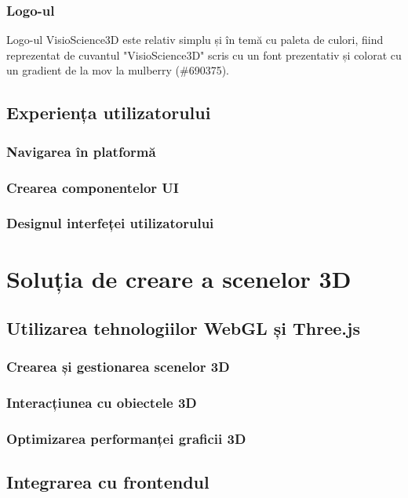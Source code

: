 
\subsubsection{Logo-ul}
Logo-ul VisioScience3D este relativ simplu și în temă cu paleta de culori, fiind reprezentat
de cuvantul "VisioScience3D" scris cu un font prezentativ și colorat cu un gradient de la
mov la mulberry (\#690375).


\subsection{Experiența utilizatorului}
\subsubsection{Navigarea în platformă}
\subsubsection{Crearea componentelor UI}
\subsubsection{Designul interfeței utilizatorului}

\section{Soluția de creare a scenelor 3D}
\label{sec:proj-3d}
\subsection{Utilizarea tehnologiilor WebGL și Three.js}
\subsubsection{Crearea și gestionarea scenelor 3D}
\subsubsection{Interacțiunea cu obiectele 3D}
\subsubsection{Optimizarea performanței graficii 3D}
\subsection{Integrarea cu frontendul}







